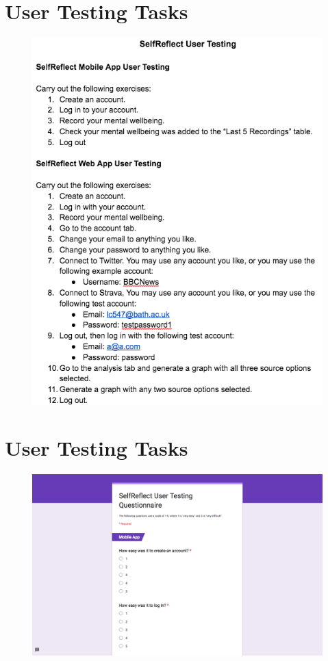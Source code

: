 \documentclass[11pt,openright,a4paper]{report}
\begin{document}
\begin{appendices}
\section{User Testing Tasks} \label{app:testing:tasks}
\begin{figure}[ht]
  \centering
  \includegraphics[width=.8\textwidth]{i/testingtasks.png}
\end{figure}

\clearpage
\section{User Testing Tasks} \label{app:testing:questionnaire}
\begin{figure}[ht]
  \centering
  \includegraphics[width=\textwidth]{i/testingquestionnaire1.png}
\end{figure}


\end{appendices}
\end{document}
